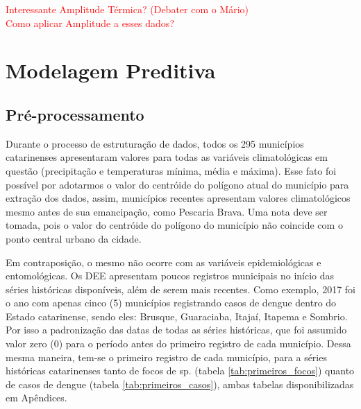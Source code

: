 \documentclass[
	12pt,				%
	openright,			%
	oneside,			%
	a4paper,			%
	english,			%
	french,				%
	spanish,			%
	brazil				%
	dvipsnames, table]{abntex2}
\begin{document}
\indent \textcolor{red}{Interessante Amplitude Térmica? (Debater com o Mário)\\
Como aplicar Amplitude a esses dados?}

\section{Modelagem Preditiva}

\subsection{Pré-processamento}

\indent Durante o processo de estruturação de dados, todos os 295 municípios catarinenses apresentaram valores para todas as variáveis climatológicas em questão (precipitação e temperaturas mínima, média e máxima). Esse fato foi possível por adotarmos o valor do centróide do polígono atual do município para extração dos dados, assim, municípios recentes apresentam valores climatológicos mesmo antes de sua emancipação, como Pescaria Brava. Uma nota deve ser tomada, pois o valor do centróide do polígono do município não coincide com o ponto central urbano da cidade.

\indent Em contraposição, o mesmo não ocorre com as variáveis epidemiológicas e entomológicas. Os \acrshort{DEE} apresentam poucos registros municipais no início das séries históricas disponíveis, além de serem mais recentes. Como exemplo, 2017 foi o ano com apenas cinco (5) municípios registrando casos de dengue dentro do Estado catarinense, sendo eles: Brusque, Guaraciaba, Itajaí, Itapema e Sombrio. Por isso a padronização das datas de todas as séries históricas, que foi assumido valor zero (0) para o período antes do primeiro registro de cada município. Dessa mesma maneira, tem-se o primeiro registro de cada município, para a séries históricas catarinenses tanto de focos de  sp. (tabela \ref{tab:primeiros_focos}) quanto de casos de dengue (tabela \ref{tab:primeiros_casos}), ambas tabelas disponibilizadas em Apêndices.



\end{document}
